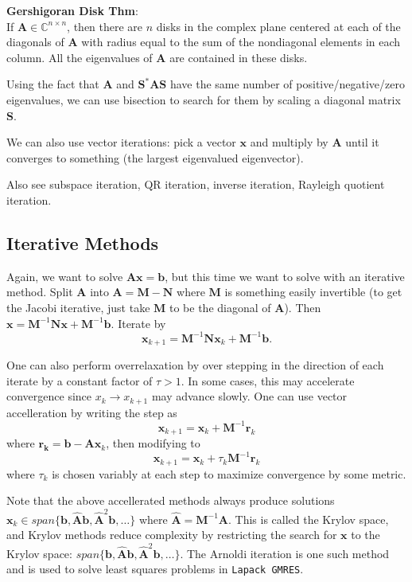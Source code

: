 \documentclass[12pt]{article}
\begin{document}
\textbf{Gershigoran Disk Thm}:\\
If $\mathbf{A} \in \mathbb{C}^{n\times n}$, then there are $n$ disks in the 
complex plane centered at each of the diagonals of $\mathbf{A}$ with radius 
equal to the sum of the nondiagonal elements in each column.
All the eigenvalues of $\mathbf{A}$ are contained in these disks.

Using the fact that $\mathbf{A}$ and $\mathbf{S}^*\mathbf{AS}$ have
the same number of positive/negative/zero eigenvalues, we can use bisection
to search for them by scaling a diagonal matrix $\mathbf{S}$.

We can also use vector iterations: pick a vector $\mathbf{x}$ and multiply by
$\mathbf{A}$ until it converges to something (the largest eigenvalued 
eigenvector).

Also see subspace iteration, QR iteration, inverse iteration, Rayleigh quotient
iteration.

\subsection*{Iterative Methods}

Again, we want to solve $\mathbf{Ax} = \mathbf{b}$, but this time we want
to solve with an iterative method.
Split $\mathbf{A}$ into $\mathbf{A} = \mathbf{M} - \mathbf{N}$ where 
$\mathbf{M}$ is something easily invertible (to get the Jacobi iterative, just
take $\mathbf{M}$ to be the diagonal of $\mathbf{A}$).
Then $\mathbf{x} = \mathbf{M}^{-1}\mathbf{Nx} + \mathbf{M}^{-1}\mathbf{b}.$
Iterate by
$$
\mathbf{x}_{k+1} = \mathbf{M}^{-1}\mathbf{Nx}_{k} + \mathbf{M}^{-1}\mathbf{b}.
$$

One can also perform overrelaxation by over stepping in the direction of each
iterate by a constant factor of $\tau > 1$.
In some cases, this may accelerate convergence since $x_k \rightarrow x_{k+1}$
may advance slowly.
One can use vector accelleration by writing the step as
$$
\mathbf{x}_{k+1} = \mathbf{x}_{k} + \mathbf{M}^{-1}\mathbf{r}_k
$$
where $\mathbf{r_k} = \mathbf{b}-\mathbf{Ax}_k$, then modifying to
$$
\mathbf{x}_{k+1} = \mathbf{x}_{k} + \tau_k\mathbf{M}^{-1}\mathbf{r}_k
$$
where $\tau_k$ is chosen variably at each step to maximize convergence by some
metric.

Note that the above accellerated methods always produce solutions 
$\mathbf{x}_k\in span\{\mathbf{b},\mathbf{\hat{A}b},\mathbf{\hat{A}}^2\mathbf{b},\ldots\}$ where $\mathbf{\hat{A}} = \mathbf{M}^{-1}\mathbf{A}$.
This is called the Krylov space, and Krylov methods reduce complexity 
by restricting the search for $\mathbf{x}$ to the Krylov space: 
$span\{\mathbf{b}, \mathbf{\hat{A}b}, \mathbf{\hat{A}}^2\mathbf{b},\ldots\}$.
The Arnoldi iteration is one such method and is used to solve least
squares problems in {\tt Lapack GMRES}.
\end{document}
